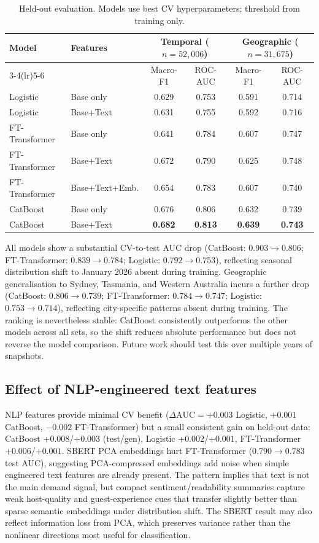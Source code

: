 \documentclass[10pt,a4paper]{article}
\newcommand{\reporttabcolsep}{4pt}
\begin{document}
\begin{table}[H]
\centering\small
\setlength{\tabcolsep}{\reporttabcolsep}
\begin{tabular}{llcccc}
\toprule
Model & Features &
  \multicolumn{2}{c}{Temporal ($n=52{,}006$)} &
  \multicolumn{2}{c}{Geographic ($n=31{,}675$)} \\
\cmidrule(lr){3-4}\cmidrule(lr){5-6}
 & & Macro-F1 & ROC-AUC & Macro-F1 & ROC-AUC \\
\midrule
Logistic       & Base only      & 0.629 & 0.753 & 0.591 & 0.714 \\
Logistic       & Base+Text      & 0.631 & 0.755 & 0.592 & 0.716 \\
FT-Transformer & Base only      & 0.641 & 0.784 & 0.607 & 0.747 \\
FT-Transformer & Base+Text      & 0.672 & 0.790 & 0.625 & 0.748 \\
FT-Transformer & Base+Text+Emb. & 0.654 & 0.783 & 0.607 & 0.740 \\
CatBoost       & Base only      & 0.676 & 0.806 & 0.632 & 0.739 \\
CatBoost       & Base+Text      & \textbf{0.682} & \textbf{0.813} & \textbf{0.639} & \textbf{0.743} \\
\bottomrule
\end{tabular}
\caption{Held-out evaluation. Models use best CV hyperparameters; threshold from
  training only.}
\label{tab:test}
\end{table}

All models show a substantial CV-to-test AUC drop
(CatBoost: $0.903{\to}0.806$; FT-Transformer: $0.839{\to}0.784$;
Logistic: $0.792{\to}0.753$), reflecting seasonal distribution shift to January
2026 absent during training.
Geographic generalisation to Sydney, Tasmania, and Western Australia
incurs a further drop (CatBoost: $0.806{\to}0.739$; FT-Transformer:
$0.784{\to}0.747$; Logistic: $0.753{\to}0.714$), reflecting city-specific
patterns absent during training. The ranking is nevertheless stable: CatBoost
consistently outperforms the other models across all sets, so the shift reduces
absolute performance but does not reverse the model comparison. Future work
should test this over multiple years of snapshots.

\subsection{Effect of NLP-engineered text features}
NLP features provide minimal CV benefit ($\Delta\text{AUC} = +0.003$ Logistic,
$+0.001$ CatBoost, $-0.002$ FT-Transformer) but a small consistent gain on
held-out data: CatBoost $+0.008$/$+0.003$ (test/gen), Logistic $+0.002$/$+0.001$,
FT-Transformer $+0.006$/$+0.001$. SBERT PCA embeddings hurt FT-Transformer
($0.790\to0.783$ test AUC), suggesting PCA-compressed embeddings add noise when
simple engineered text features are already present. The pattern implies that
text is not the main demand signal, but compact sentiment/readability summaries
capture weak host-quality and guest-experience cues that transfer slightly better
than sparse semantic embeddings under distribution shift. The SBERT result may
also reflect information loss from PCA, which preserves variance rather than the
nonlinear directions most useful for classification.
\end{document}

